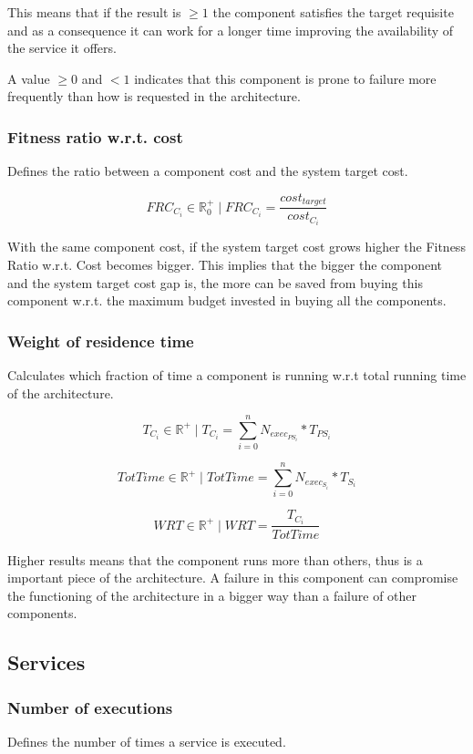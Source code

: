 This means that if the result is $\ge 1$ the component satisfies the target requisite and as a consequence it can work for a longer time improving the availability of the service it offers. 

A value $\ge 0 $ and $<1$ indicates that this component is prone to failure more frequently than how is requested in the architecture.

\subsubsection{Fitness ratio w.r.t. cost}
Defines the ratio between a component cost and the system target cost. 

\[ FRC_{C_i} \in \mathbb{R}^+_0 \; | \; FRC_{C_i} = \frac{cost_{target}}{cost_{C_i}}\]

With the same component cost, if the system target cost grows higher the Fitness Ratio w.r.t. Cost becomes bigger. This implies that the bigger the component and the system target cost gap is, the more can be saved from buying this component w.r.t. the maximum budget invested in buying all the components.

\subsubsection{Weight of residence time}
Calculates which fraction of time a component is running w.r.t total running time of the architecture.

\[ T_{C_i} \in \mathbb{R}^+ \; | \; T_{C_i} = \sum_{i=0}^{n} N_{exec_{PS_i}} * T_{PS_i} \]

\[ TotTime \in \mathbb{R^+} \; | \; TotTime = \sum_{i=0}^{n}N_{exec_{S_i}} * T_{S_i} \]

\[ WRT \in \mathbb{R}^+ \; | \; WRT = \frac{T_{C_i}}{TotTime} \]

Higher results means that the component runs more than others, thus is a important piece of the architecture. A failure in this component can compromise the functioning of the architecture in a bigger way than a failure of other components.

\subsection{Services}
\subsubsection{Number of executions}
Defines the number of times a service is executed.

